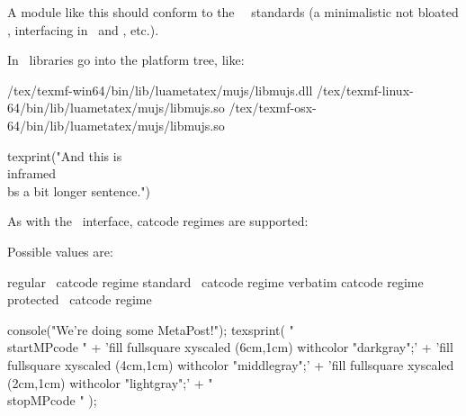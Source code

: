 \startitem
    A module like this should conform to the \CONTEXT\ \LMTX\ standards (a
    minimalistic not bloated \API, interfacing in \LUA\ and \TEX, etc.).
\stopitem

\stopitemize

\blank[2*line]

In \CONTEXT\ libraries go into the platform tree, like:

\starttyping
/tex/texmf-win64/bin/lib/luametatex/mujs/libmujs.dll
/tex/texmf-linux-64/bin/lib/luametatex/mujs/libmujs.so
/tex/texmf-osx-64/bin/lib/luametatex/mujs/libmujs.so
\stoptyping

\stoptitle

\starttitle[title=An example]

\startbuffer
\usemodule[ecmascript]



\startecmacode
    texprint("And this is \\inframed{\\bs a bit longer} sentence.")
\stopecmacode
\stopbuffer

\typebuffer

\getbuffer

\stoptitle

\starttitle[title=Catcodes]

As with the \LUA\ interface, catcode regimes are supported:

\startbuffer
{}
\stopbuffer

\typebuffer

\getbuffer

Possible values are:

\starttabulate
\NC {} \NC regular \TEX\ catcode regime       \NC \NR
\NC {} \NC standard \CONTEXT\ catcode regime  \NC \NR
\NC {} \NC verbatim catcode regime            \NC \NR
\NC {} \NC protected \CONTEXT\ catcode regime \NC \NR
\stoptabulate

\stoptitle

\starttitle[title=Print whatever you want]

\startbuffer
\startecmacode
  console("We're doing some MetaPost!");
  texsprint(
      "\\startMPcode "
    + 'fill fullsquare xyscaled (6cm,1cm) withcolor "darkgray";'
    + 'fill fullsquare xyscaled (4cm,1cm) withcolor "middlegray";'
    + 'fill fullsquare xyscaled (2cm,1cm) withcolor "lightgray";'
    + "\\stopMPcode "
  );
\stopecmacode
\stopbuffer

